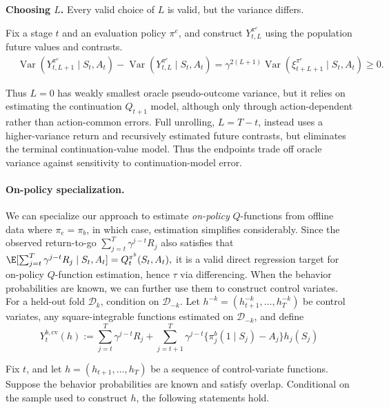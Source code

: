 \documentclass[opre,nonblindrev]{informs4}
\newenvironment{revision}{\begingroup\color{revisionblue}\ignorespaces}{\endgroup}
\providecommand{\cD}{\mathcal D}
\newcommand{\blipadv}{\tau}
\begin{document}
\begin{revision}
\textbf{Choosing $L$.}
Every valid choice of $L$ is valid, but the variance differs.
\begin{proposition}
\label{prop:oracle-unrolling-variance}
Fix a stage $t$ and an evaluation policy $\pi^e$, and construct
$Y_{t,L}^{\pi^e}$ using the population future values and contrasts.
\begin{align}
&\operatorname{Var}(
Y_{t,L+1}^{\pi^e}\mid S_t,A_t
)
-
\operatorname{Var}(
Y_{t,L}^{\pi^e}\mid S_t,A_t
)
=
\gamma^{2(L+1)}
\operatorname{Var}(
\xi_{t+L+1}^{\pi^e}\mid S_t,A_t
)
\ge 0.
\label{eq:conditional-unrolling-variance-order}
\end{align}
\end{proposition}
Thus $L=0$ has weakly smallest oracle pseudo-outcome variance, but it relies on estimating the continuation $Q_{t+1}$
model, although only through action-dependent rather than action-common
errors. Full unrolling, $L=T-t$, instead uses a higher-variance return and
recursively estimated future contrasts, but eliminates the terminal
continuation-value model. Thus the endpoints trade off oracle variance against sensitivity to continuation-model error.

\paragraph{On-policy specialization.}
We can specialize our approach to estimate \textit{on-policy} $Q$-functions from offline data where $\pi_e = \pi_b$, in which case, estimation simplifies considerably. Since the observed return-to-go $\sum_{j=t}^T\gamma^{j-t}R_j$ also satisfies that $\E[ \sum_{j=t}^T\gamma^{j-t}R_j \mid S_t, A_t] = Q_t^{\pi^b}(S_t,A_t),$ it is a valid direct regression target for on-policy $Q$-function estimation, hence $\blipadv$ via differencing. When the behavior probabilities are known, we can further use them to construct control variates.
For a held-out fold $\cD_k$, condition on $\cD_{-k}$.  Let
$h^{-k}=(h_{t+1}^{-k},\ldots,h_T^{-k})$ be control variates, any square-integrable functions
estimated on $\cD_{-k}$, and define
\begin{equation}
Y_t^{b, \mathrm{cv}}(h):=\sum_{j=t}^T \gamma^{j-t} R_j+\sum_{j=t+1}^T \gamma^{j-t}\{\pi_j^b\left(1 \mid S_j\right)-A_j\} h_j\left(S_j\right)
\label{eq:cv-family}
\end{equation}


\begin{proposition}
\label{prop:behavior-policy-control-variates}
Fix \(t\), and let
\(h=(h_{t+1},\ldots,h_T)\) be a sequence of control-variate functions.  Suppose the behavior probabilities are known
and satisfy overlap.  Conditional on the sample used to construct \(h\),
the following statements hold.


\end{proposition}
\end{revision}
\end{document}
